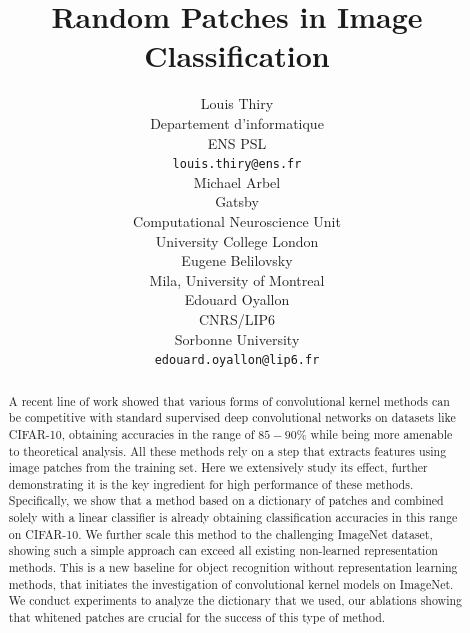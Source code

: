 \documentclass{article}
\title{Random Patches in Image Classification}
\author{%
  Louis Thiry \\
  Departement d'informatique \\
  ENS PSL\\
  \texttt{louis.thiry@ens.fr} \\
  \And
  Michael Arbel\\
  Gatsby\\ Computational Neuroscience Unit\\
  University College London\\
  \textt{michael.n.arbel@gmail.com}
    Eugene Belilovsky\\
  Mila, University of Montreal\\
  \textt{eugene.belilovsky@umontreal.ca}
  \And
  Edouard Oyallon \\
  CNRS/LIP6 \\
  Sorbonne University \\
  \texttt{edouard.oyallon@lip6.fr} \\
}
\begin{document}
\maketitle

\begin{abstract}
A recent line of work showed that  various forms of convolutional  kernel methods can be competitive with standard supervised deep convolutional networks on datasets like CIFAR-10, obtaining accuracies in the range of $85-90\%$ while being more amenable to theoretical analysis. All these methods rely on a step that extracts features using image patches from the training set. Here we extensively study its effect, further demonstrating it is the key ingredient for high performance of these methods. Specifically, we show that a method based on a dictionary of patches and combined solely with a linear classifier is already obtaining classification accuracies in this range on CIFAR-10. We further scale this method to the challenging ImageNet dataset, showing such a simple approach can exceed all existing non-learned representation methods. This is a new baseline for object recognition without representation learning methods, that  initiates the investigation of  convolutional kernel models  on ImageNet. We conduct experiments to analyze the dictionary that we used, our ablations showing that whitened patches are crucial for the success of this  type of method. 

 
\end{abstract}
\end{document}
